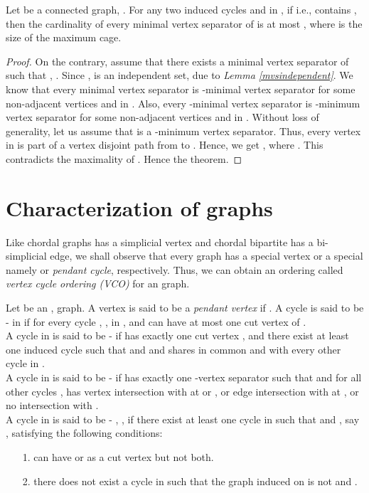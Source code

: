 \documentclass[runningheads]{llncs}
\begin{document}
\begin{theorem}
\label{mvssc2ksize}
Let  be a connected  graph, . For any two induced cycles  and  in , if  i.e.,  contains , then the cardinality of every minimal vertex separator of  is at most , where  is the size of the maximum cage. 
\end{theorem}
\begin{proof}
On the contrary, assume that there exists a minimal vertex separator  of  such that , . Since ,  is an independent set, due to \emph{Lemma \ref{mvsindependent}}. We know that every minimal vertex separator is -minimal vertex separator for some non-adjacent vertices  and  in . Also, every -minimal vertex separator is -minimum vertex separator for some non-adjacent vertices  and  in . Without loss of generality, let us assume that  is a -minimum vertex separator. Thus, every vertex in  is part of a vertex disjoint path from  to . Hence, we get , where . This contradicts the maximality of . Hence the theorem. 
\end{proof}

\section{Characterization of  graphs}
Like chordal graphs has a simplicial vertex \cite{tarjan} and chordal bipartite \cite{GolumbicGoss} has a bi-simplicial edge, we shall observe that every  graph has a special vertex or a special  namely   or \emph{pendant cycle}, respectively. Thus, we can obtain an ordering called \emph{vertex cycle ordering (VCO)} for an  graph. 

\begin{definition}
Let  be an , graph. A vertex  is said to be a \emph{pendant vertex} if . A cycle  is said to be -  in  if for every cycle , , in ,  and  can have at most one cut vertex of .\\

 A cycle  in  is said to be -  if  has exactly one cut vertex , and there exist at least one induced cycle  such that  and  and  shares  in common and with every other cycle  in  . \\
 
 A cycle  in  is said to be -  if  has exactly one -vertex separator such that  and for all other cycles ,  has vertex intersection with  at  or , or edge intersection with  at , or no intersection with .\\

 A cycle  in  is said to be - , , if there exist at least one cycle  in  such that  and , say , satisfying the following conditions:
\begin{itemize}
\item[1.]  can have  or  as a cut vertex but not both.
\item[2.] there does not exist a cycle  in  such that the graph induced on  is not  and .
\end{itemize}   
\end{definition}
\end{document}
